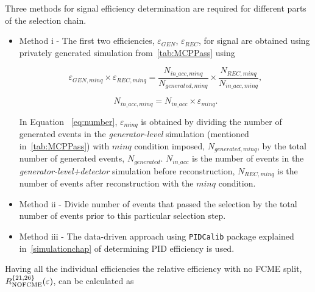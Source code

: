 Three methods for signal efficiency determination
are required for different parts of the selection chain.

\begin{itemize}
	\item Method \Rn{1} - The first two efficiencies, $\varepsilon_{GEN}$, $\varepsilon_{REC}$, for signal are obtained using privately generated simulation from~\autoref{tab:MCPPass} using

\begin{equation}
{\varepsilon_{GEN,minq}}\times {\varepsilon_{REC,minq}}= \frac{N_{in\_acc,minq}}{N_{generated,minq}}\times \frac{N_{REC,minq}}{N_{in\_acc,minq}},
\end{equation}

\begin{equation}
N_{in\_acc,minq} = N_{in\_acc} \times \varepsilon_{minq}.
\label{eq:number}
\end{equation}

In Equation ~\autoref{eq:number}, $\varepsilon_{minq}$ is obtained by dividing the number of generated events in the \textit{generator-level} simulation (mentioned in~\autoref{tab:MCPPass}) with $minq$ condition imposed, $N_{generated,minq}$, by the total number of generated events, $N_{generated}$. $N_{in\_acc}$ is the number of events in the \textit{generator-level+detector} simulation before reconstruction, $N_{REC,minq}$ is the number of events after reconstruction with the $minq$ condition.
\item Method \Rn{2} - Divide number of events that passed the selection by the total number of events prior to this particular selection step.
\item Method \Rn{3} - The data-driven approach using \texttt{PIDCalib} package explained in~\autoref{simulationchap} of determining PID efficiency is used.
\end{itemize}

Having all the individual efficiencies the relative efficiency with no FCME split, $R_{\rm{NOFCME}}^{\{21,26\}}(\varepsilon)$, can be calculated as 


